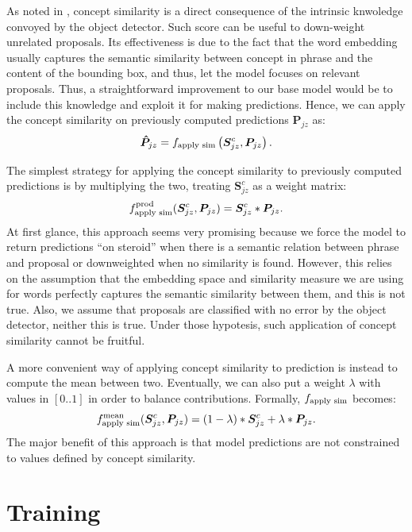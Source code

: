 \documentclass{article}
\begin{document}
As noted in \cite{chen2018knowledge}, concept similarity is a direct
consequence of the intrinsic knwoledge convoyed by the object
detector. Such score can be useful to down-weight unrelated proposals.
Its effectiveness is due to the fact that the word embedding usually
captures the semantic similarity between concept in phrase and the
content of the bounding box, and thus, let the model focuses on
relevant proposals. Thus, a straightforward improvement to our base
model would be to include this knowledge and exploit it for making
predictions. Hence, we can apply the concept similarity on previously
computed predictions $\bm{P}_{jz}$ as:
\begin{equation}
  \bm{\hat{P}}_{jz} = f_{\text{apply sim}} \left( \bm{S}^c_{jz}, \bm{P}_{jz} \right).
\end{equation}

The simplest strategy for applying the concept similarity to
previously computed predictions is by multiplying the two, treating
$\bm{S}^c_{jz}$ as a weight matrix:
\begin{equation}
  f_{\text{apply sim}}^{\text{prod}} (\bm{S}^c_{jz}, \bm{P}_{jz}) = \bm{S}^c_{jz} * \bm{P}_{jz}.
\end{equation}
At first glance, this approach seems very promising because we force
the model to return predictions ``on steroid'' when there is a
semantic relation between phrase and proposal or downweighted when no
similarity is found. However, this relies on the assumption that the
embedding space and similarity measure we are using for words
perfectly captures the semantic similarity between them, and this is
not true. Also, we assume that proposals are classified with no error
by the object detector, neither this is true. Under those hypotesis,
such application of concept similarity cannot be fruitful. 

A more convenient way of applying concept similarity to prediction is
instead to compute the mean between two. Eventually, we can also put a
weight $\lambda$ with values in $[0 .. 1]$ in order to balance
contributions. Formally, $f_{\text{apply sim}}$ becomes:
\begin{equation}
  f_{\text{apply sim}}^{\text{mean}} (\bm{S}^c_{jz}, \bm{P}_{jz}) = (1 - \lambda) * \bm{S}^c_{jz} + \lambda * \bm{P}_{jz}.
\end{equation}
The major benefit of this approach is that model predictions are not
constrained to values defined by concept similarity.

\section{Training}
\end{document}
